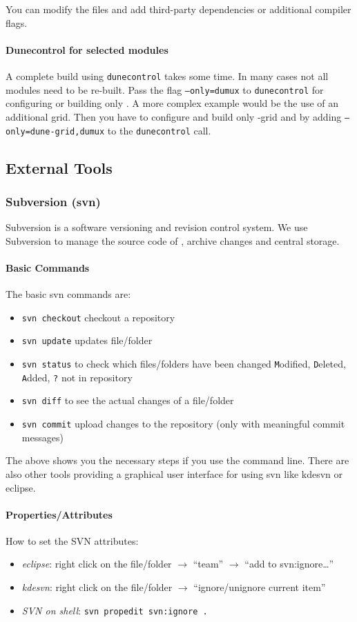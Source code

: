 You can modify the files and add third-party dependencies or additional compiler flags.

\paragraph{Dunecontrol for selected modules}
A complete build using \texttt{dunecontrol} takes some time. In many cases not all modules need to be re-built.
Pass the flag \texttt{--only=dumux} to \texttt{dunecontrol} for configuring or building only \Dumux. A more
complex example would be the use of an additional grid. Then you have to configure and build only \Dune{}-grid
and \Dumux by adding \texttt{--only=dune-grid,dumux} to the \texttt{dunecontrol} call.

\subsection{External Tools}
\subsubsection{Subversion (svn)}

Subversion is a software versioning and revision control system. We use Subversion to manage the source code
of \Dumux, archive changes and central storage.

\paragraph{Basic Commands}
The basic svn commands are:
\begin{itemize}
  \item \texttt{svn checkout} checkout a repository
  \item \texttt{svn update} updates file/folder
  \item \texttt{svn status} to check which files/folders have been changed
        \texttt{M}odified, \texttt{D}eleted, \texttt{A}dded, \texttt{?} not in repository
  \item \texttt{svn diff} to see the actual changes of a file/folder
  \item \texttt{svn commit} upload changes to the repository (only with meaningful
        commit messages)
\end{itemize}
The above shows you the necessary steps if you use the command line. There are also other tools providing a graphical 
user interface for using svn like kdesvn or eclipse.

\paragraph{Properties/Attributes}
How to set the SVN attributes:
\begin{itemize}
 \item{\em eclipse}: right click on the file/folder $\rightarrow$ ``team''
        $\rightarrow$ ``add to svn:ignore\dots''
 \item{\em kdesvn}: right click on the file/folder $\rightarrow$ ``ignore/unignore
        current item''
 \item{\em SVN on shell}: \verb+svn propedit svn:ignore .+
\end{itemize}

